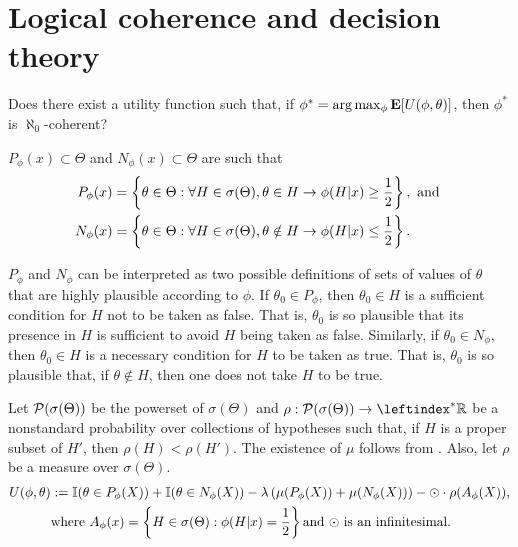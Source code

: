 \section{Logical coherence and decision theory}
\label{sec:decision}


Does there exist a utility function such that,
if $\phi^* = \arg \max_{\phi} {\textbf{E}}[U(\phi,\theta)]$,
then $\phi^*$ is $\aleph_0$-coherent?

\begin{definition}
 $P_{\phi}(x) \subset \Theta$ and
 $N_{\phi}(x) \subset \Theta$ are such that
 \label{def:region_p_n}
 \begin{align*}
  P_{\phi}(x) 
  &= \left\{\theta \in \Theta:
  \forall H \in \sigma(\Theta),
  \theta \in H \rightarrow 
  \phi(H|x) \geq \frac{1}{2}\right\}, \text{ and } \\
  N_{\phi}(x)
  &= \left\{\theta \in \Theta:
  \forall H \in \sigma(\Theta),
  \theta \notin H \rightarrow 
  \phi(H|x) \leq \frac{1}{2}\right\}.
 \end{align*}
\end{definition}

$P_{\phi}$ and $N_{\phi}$ can be
interpreted as two possible definitions of
sets of values of $\theta$ that are
highly plausible according to $\phi$.
If $\theta_0 \in P_{\phi}$, then
$\theta_0 \in H$ is a sufficient condition
for $H$ not to be taken as false.
That is, $\theta_0$ is so plausible that
its presence in $H$ is sufficient
to avoid $H$ being taken as false.
Similarly, if $\theta_0 \in N_{\phi}$, then
$\theta_0 \in H$ is a necessary condition for
$H$ to be taken as true.
That is, $\theta_0$ is so plausible that,
if $\theta \notin H$, then
one does not take $H$ to be true.

\begin{definition}
 \label{def:u_gfbst}
  Let $\mathcal{P}(\sigma(\Theta))$ be
  the powerset of $\sigma(\Theta)$ and
  $\rho: \mathcal{P}(\sigma(\Theta))
 \rightarrow \leftindex^*{\Re}$ be
 a nonstandard probability over
 collections of hypotheses such that,
 if $H$ is a proper subset of $H'$, then
 $\rho(H) < \rho(H')$.
 The existence of $\mu$ follows from
 \citet{Schervish2025}. Also, let
 $\rho$ be a measure over $\sigma(\Theta)$.
 \begin{align*}
  U(\phi, \theta)
  &:= {\mathbb I}(\theta \in P_{\phi}(X))
 + {\mathbb I}(\theta \in N_{\phi}(X))
  -\lambda \left(\mu(P_{\phi}(X))
  +\mu(N_{\phi}(X)) \right) 
  -\odot \cdot \rho(A_{\phi}(X)), \\
  & \text{where } A_{\phi}(x) = 
  \left\{H \in \sigma(\Theta): \phi(H|x) = \frac{1}{2} 
  \right\} \text{and $\odot$ is an infinitesimal}.
 \end{align*}
\end{definition}

